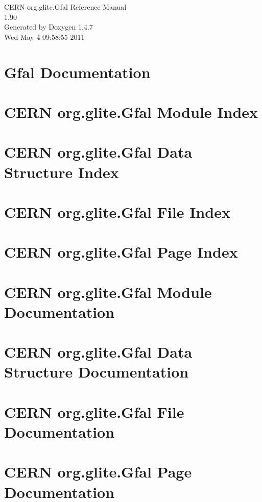 \documentclass[a4paper]{book}
\begin{document}
\begin{titlepage}
\vspace*{7cm}
\begin{center}
{\Large CERN org.glite.Gfal Reference Manual\\[1ex]\large 1.90 }\\
\vspace*{1cm}
{\large Generated by Doxygen 1.4.7}\\
\vspace*{0.5cm}
{\small Wed May 4 09:58:55 2011}\\
\end{center}
\end{titlepage}
\clearemptydoublepage
{}
\tableofcontents
\clearemptydoublepage
{}
\chapter{Gfal Documentation }
\label{index}
\chapter{CERN org.glite.Gfal Module Index}

\chapter{CERN org.glite.Gfal Data Structure Index}

\chapter{CERN org.glite.Gfal File Index}

\chapter{CERN org.glite.Gfal Page Index}

\chapter{CERN org.glite.Gfal Module Documentation}





\chapter{CERN org.glite.Gfal Data Structure Documentation}



\chapter{CERN org.glite.Gfal File Documentation}

















\chapter{CERN org.glite.Gfal Page Documentation}


\printindex
\end{document}
